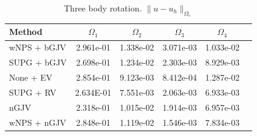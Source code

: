 \begin{table}
\centering
\begin{tabular}{lccccc}
\hline
Method &  $\Omega_1$ &  $\Omega_2$ &  $\Omega_3$ &  $\Omega_4$\\\hline
wNPS + bGJV  &  2.961e-01 & 1.338e-02
&  3.071e-03
&  1.033e-02\\

SUPG + bGJV  &
  2.698e-01    
  & 1.234e-02
  & 2.303e-03
  & 8.929e-03 \\
    None + EV  &
  2.854e-01     
&  9.123e-03
&  8.412e-04
&  1.287e-02\\

SUPG + RV  &
  2.634E-01     
&  7.551e-03
&  2.063e-03
&  6.933e-03 \\
nGJV  &
  2.318e-01     
&  1.015e-02
&  1.914e-03
&  6.957e-03\\

wNPS + nGJV  &
  2.848e-01     
&  1.119e-02
&  1.546e-03
&  7.834e-03\\
\hline
\end{tabular}
\caption{Three body rotation. $\|u-u_h\|_{\Omega_i}$}\label{tab-ex15_malla2D_new}
\end{table}

